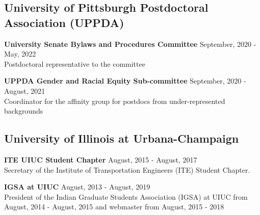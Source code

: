 \documentclass[12pt]{article}
\begin{document}
\subsection*{University of Pittsburgh Postdoctoral Association (UPPDA)}
\textbf{University Senate Bylaws and Procedures Committee} \hfill September, 2020 - May, 2022 \\
Postdoctoral representative to the committee

\textbf{UPPDA Gender and Racial Equity Sub-committee} \hfill September, 2020 - August, 2021 \\
Coordinator for the affinity group for postdocs from under-represented backgrounds \\

\subsection*{University of Illinois at Urbana-Champaign} 
\textbf{ITE UIUC Student Chapter} \hfill August, 2015 - August, 2017 \\
Secretary of the Institute of Transportation Engineers (ITE) Student Chapter. 

\textbf{IGSA at UIUC} \hfill August, 2013 - August, 2019 \\
President of the Indian Graduate Students Association (IGSA) at UIUC from August, 2014 - August, 2015 and webmaster from August, 2015 - 2018 \\
\end{document}

